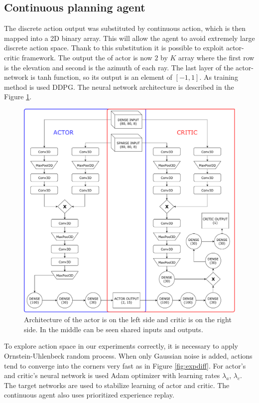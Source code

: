 \clearpage
\subsection{Continuous planning agent}
The discrete action output was substituted by continuous action, which is then mapped into a 2D binary array. This will allow the agent to avoid extremely large discrete action space. Thank to this substitution it is possible to exploit actor-critic framework. The output the of actor is now $2$ by $K$ array where the first row is the elevation and second is the azimuth of each ray. The last layer of the actor-network is tanh function, so its output is an element of $[-1, 1]$. As training method is used DDPG. The neural network architecture is described in the Figure \ref{fig:ddpg}.

\begin{figure}[!h]
\centering
\includegraphics[scale=0.55]{fig/ddpg.pdf}
\caption[DDPG architecture]{Architecture of the actor is on the left side and critic is on the right side. In the middle can be seen shared inputs and outputs.}
\label{fig:ddpg}
\end{figure}

\pagebreak
To explore action space in our experiments correctly, it is necessary to apply Ornstein-Uhlenbeck random process. When only Gaussian noise is added, actions tend to converge into the corners very fast as in Figure \ref{fig:expdiff}. For actor's and critic's neural network is used Adam optimizer with learning rates $\lambda_{a}$, $\lambda_{c}$. The target networks are used to stabilize learning of actor and critic. The continuous agent also uses prioritized experience replay.

